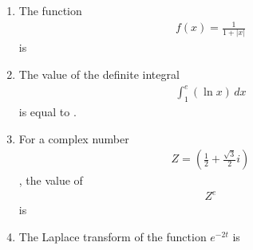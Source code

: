 \documentclass[journal]{IEEEtran}
\begin{document}
\begin{enumerate}
    \item The function 
    \begin{align}
     f(x) = \frac{1}{1 + |x|}   
    \end{align}
      is
    \begin{enumerate}  \end{enumerate}              
    
    \hfill{}
    
    \item The value of the definite integral 
    \begin{align}
      \int_1^e (\ln x) \, dx   
    \end{align}
     is equal to . 
    \hfill{}
    \item For a complex number  
    \begin{align}
         Z = \left( \frac{1}{2} + \frac{\sqrt{3}}{2} i \right) 
    \end{align}
   , the value of 
   \begin{align}
     Z^e   
   \end{align}
    is
    
    \begin{enumerate}  \end{enumerate}              
    
    \hfill{}
    
    \item The Laplace transform of the function $e^{-2t}$ is
    
    \begin{enumerate}  \end{enumerate}              
    

\end{enumerate}
\end{document}
